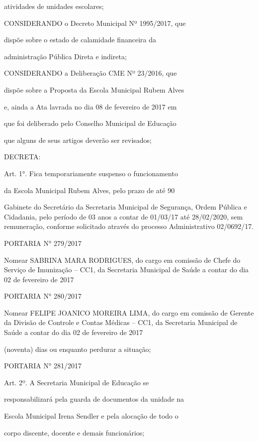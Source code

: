 \documentclass{doliberto}
\begin{document}
atividades de unidades escolares; 
 

CONSIDERANDO  o  Decreto  Municipal  Nº  1995/2017,  que 

dispõe  sobre  o  estado  de  calamidade  financeira  da 

administração Pública Direta e indireta; 

 

CONSIDERANDO  a  Deliberação  CME  Nº  23/2016,  que 

dispõe sobre a  Proposta  da  Escola Municipal Rubem Alves 

e,  ainda  a  Ata  lavrada  no  dia  08  de  fevereiro  de  2017  em 

que  foi  deliberado  pelo  Conselho  Municipal  de  Educação 

que alguns de seus artigos deverão ser revisados;  

 

DECRETA:  

 

Art.  1°.  Fica  temporariamente  suspenso  o  funcionamento 

da  Escola  Municipal  Rubem  Alves,  pelo  prazo  de  até  90 

Gabinete  do  Secretário  da  Secretaria  Municipal  de 
Segurança, Ordem Pública e Cidadania, pelo período de  03 
anos  a  contar  de  01/03/17  até  28/02/2020,  sem 
remuneração,  conforme  solicitado  através  do  processo 
Administrativo 02/0692/17. 
 
PORTARIA N° 279/2017 

Nomear SABRINA MARA RODRIGUES, do cargo em 
comissão de Chefe do Serviço de Imunização – CC1, da 
Secretaria Municipal de Saúde a contar do dia 02 de 
fevereiro de 2017 

PORTARIA N° 280/2017 

Nomear FELIPE JOANICO MOREIRA LIMA, do cargo em 
comissão de Gerente da Divisão de Controle e Contas 
Médicas – CC1, da Secretaria Municipal de Saúde a 
contar do dia 02 de fevereiro de 2017 

(noventa) dias ou enquanto perdurar a situação;  

PORTARIA N° 281/2017 

Art.  2º.  A  Secretaria  Municipal  de  Educação  se 

responsabilizará pela guarda de documentos da unidade na 

Escola  Municipal  Irena  Sendler  e  pela  alocação  de  todo  o 

corpo discente, docente e demais funcionários; 
\end{document}
